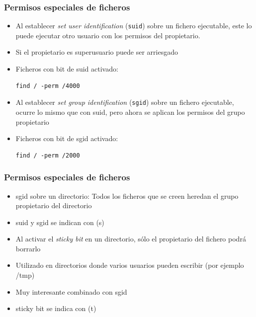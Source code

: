 \documentclass[aspectratio=169]{beamer}
\begin{document}
\begin{frame}[fragile]
  \frametitle{Permisos especiales de ficheros}
  \begin{itemize}
  \item Al establecer \textit{set user identification}
    (\texttt{suid}) sobre un fichero ejecutable, este lo puede
    ejecutar otro usuario con los permisos del propietario.
  \item Si el propietario es superusuario puede ser arriesgado
  \item Ficheros con bit de suid activado:
\begin{verbatim}
find / -perm /4000
\end{verbatim}
  \item Al establecer \textit{set group identification}
    (\texttt{sgid}) sobre un fichero ejecutable, ocurre lo mismo que
    con suid, pero ahora se aplican los permisos del grupo
    propietario 
  \item Ficheros con bit de sgid activado:
\begin{verbatim}
find / -perm /2000
\end{verbatim}
  \end{itemize}
\end{frame}

\begin{frame}
  \frametitle{Permisos especiales de ficheros}
  \begin{itemize}
  \item sgid sobre un directorio: Todos los ficheros que se creen
    heredan el grupo propietario del directorio
  \item suid y sgid se indican con (s)
  \item Al activar el \textit{sticky bit} en un directorio, sólo el
    propietario del fichero podrá borrarlo 
  \item Utilizado en directorios donde varios usuarios pueden escribir
    (por ejemplo /tmp) 
  \item Muy interesante combinado con sgid
  \item sticky bit se indica con (t)
  \end{itemize}
\end{frame}
\end{document}
